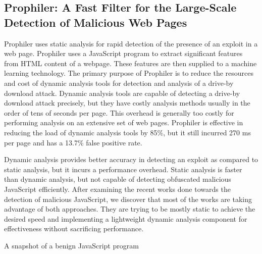 \subsection{Prophiler: A Fast Filter for the Large-Scale Detection of Malicious Web Pages ~\cite{g16}}

Prophiler uses static analysis for rapid detection of the presence of an exploit in a web page. Prophiler uses a JavaScript program to extract significant features from HTML content of a webpage. These features are then supplied to a machine learning technology. The primary purpose of Prophiler is to reduce the resources and cost of dynamic analysis tools for detection and analysis of a drive-by download attack.  Dynamic analysis tools are capable of detecting a drive-by download attack precisely, but they have costly analysis methods usually in the order of tens of seconds per page. This overhead is generally too costly for performing analysis on an extensive set of web pages. Prophiler is effective in reducing the load of dynamic analysis tools by 85\%, but it still incurred 270 ms per page and has a 13.7\% false positive rate.

Dynamic analysis provides better accuracy in detecting an exploit as compared to static analysis, but it incurs a performance overhead. Static analysis is faster than dynamic analysis, but not capable of detecting obfuscated malicious JavaScript efficiently. After examining the recent works done towards the detection of malicious JavaScript, we discover that most of the works are taking advantage of both approaches. They are trying to be mostly static to achieve the desired speed and implementing a lightweight dynamic analysis component for effectiveness without sacrificing performance.

\newpage

\bigskip

A snapshot of a benign JavaScript program

\bigskip

